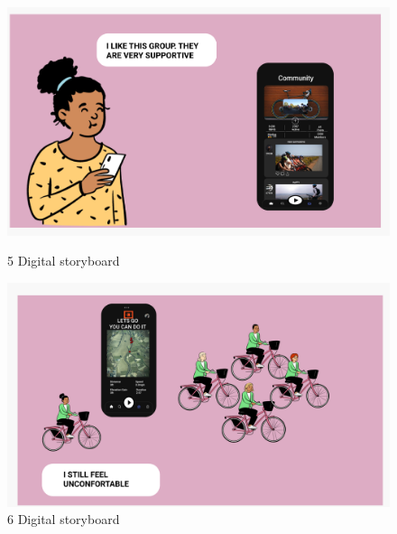 \documentclass{l4proj}
\begin{document}
\begin{figure}
 \centering
 \begin{minipage}[b]{0.55\textwidth}
  \includegraphics[width=1\textwidth]{images/5.png}
  \caption{5 Digital storyboard}
 \end{minipage}%
 \begin{minipage}[b]{0.55\textwidth}
  \includegraphics[width=1\textwidth]{images/6.png}
  \caption{6 Digital storyboard}
 \end{minipage}
\end{figure}
\end{document}
